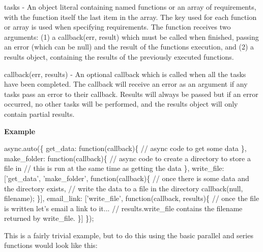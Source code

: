 \begin{DoxyItemize}
\item tasks -\/ An object literal containing named functions or an array of requirements, with the function itself the last item in the array. The key used for each function or array is used when specifying requirements. The function receives two arguments\+: (1) a callback(err, result) which must be called when finished, passing an error (which can be null) and the result of the function\textquotesingle{}s execution, and (2) a results object, containing the results of the previously executed functions.
\item callback(err, results) -\/ An optional callback which is called when all the tasks have been completed. The callback will receive an error as an argument if any tasks pass an error to their callback. Results will always be passed but if an error occurred, no other tasks will be performed, and the results object will only contain partial results.
\end{DoxyItemize}

{\bfseries Example}


\begin{DoxyCode}
async.auto(\{
    get\_data: \textcolor{keyword}{function}(callback)\{
        \textcolor{comment}{// async code to get some data}
    \},
    make\_folder: \textcolor{keyword}{function}(callback)\{
        \textcolor{comment}{// async code to create a directory to store a file in}
        \textcolor{comment}{// this is run at the same time as getting the data}
    \},
    write\_file: [\textcolor{stringliteral}{'get\_data'}, \textcolor{stringliteral}{'make\_folder'}, \textcolor{keyword}{function}(callback)\{
        \textcolor{comment}{// once there is some data and the directory exists,}
        \textcolor{comment}{// write the data to a file in the directory}
        callback(null, filename);
    \}],
    email\_link: [\textcolor{stringliteral}{'write\_file'}, \textcolor{keyword}{function}(callback, results)\{
        \textcolor{comment}{// once the file is written let's email a link to it...}
        \textcolor{comment}{// results.write\_file contains the filename returned by write\_file.}
    \}]
\});
\end{DoxyCode}


This is a fairly trivial example, but to do this using the basic parallel and series functions would look like this\+:


